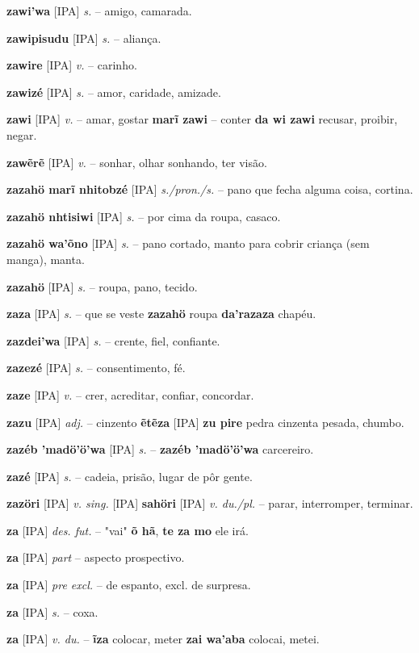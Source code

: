 \textbf{zawi'wa} [IPA] \textit{s.} -- amigo, camarada.

\textbf{zawipisudu} [IPA] \textit{s.} -- aliança.

\textbf{zawire} [IPA] \textit{v.} -- carinho.

\textbf{zawizé} [IPA] \textit{s.} -- amor, caridade, amizade.

\textbf{zawi} [IPA] \textit{v.} -- amar, gostar  \textbf{marĩ zawi} -- conter  \textbf{da wi zawi} recusar, proibir, negar.

\textbf{zawẽrẽ} [IPA] \textit{v.} -- sonhar, olhar sonhando, ter visão.

\textbf{zazahö marĩ nhitobzé} [IPA] \textit{s./pron./s.} -- pano que fecha alguma coisa, cortina.

\textbf{zazahö nhtisiwi} [IPA] \textit{s.} -- por cima da roupa, casaco.

\textbf{zazahö wa'õno} [IPA] \textit{s.} -- pano cortado, manto para cobrir criança (sem manga), manta.

\textbf{zazahö} [IPA] \textit{s.} -- roupa, pano, tecido.

\textbf{zaza} [IPA] \textit{s.} -- que se veste  \textbf{zazahö} roupa  \textbf{da'razaza} chapéu.

\textbf{zazdei'wa} [IPA] \textit{s.} -- crente, fiel, confiante.

\textbf{zazezé} [IPA] \textit{s.} -- consentimento, fé.

\textbf{zaze} [IPA] \textit{v.} -- crer, acreditar, confiar, concordar.

\textbf{zazu} [IPA] \textit{adj.} -- cinzento  \textbf{ẽtẽza} [IPA] \textbf{zu pire} pedra cinzenta pesada, chumbo.

\textbf{zazéb 'madö'ö'wa} [IPA] \textit{s.} -- \textbf{zazéb 'madö'ö'wa} carcereiro.

\textbf{zazé} [IPA] \textit{s.} -- cadeia, prisão, lugar de pôr gente.

\textbf{zazöri} [IPA] \textit{v. sing.} [IPA] \textbf{sahöri} [IPA] \textit{v. du./pl.} -- parar, interromper, terminar.

\textbf{za} [IPA] \textit{des. fut.} -- "vai"  \textbf{õ hã}, \textbf{te za mo} ele irá.

\textbf{za} [IPA] \textit{part} -- {aspecto prospectivo}.

\textbf{za} [IPA] \textit{pre excl.} -- de espanto, excl. de surpresa.

\textbf{za} [IPA] \textit{s.} -- coxa.

\textbf{za} [IPA] \textit{v. du.} -- \textbf{ĩza} colocar, meter  \textbf{zai wa'aba} colocai, metei.

